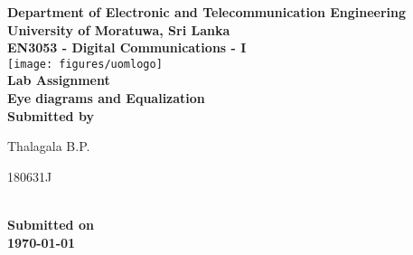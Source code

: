 \begin{titlepage}
\center %

\textbf{\large Department of Electronic and Telecommunication Engineering}\\[0.5cm]
\textbf{\Large University of Moratuwa, Sri Lanka}\\[1cm]
\textbf{\large EN3053 - Digital Communications - I}\\[2cm]
\texttt{[image: figures/uomlogo]}\\[2cm]

	
\textbf{\Huge Lab Assignment}\\[0.5cm]
\textbf{\Large Eye diagrams and Equalization }\\[5cm]



\textbf{\large Submitted by}\\[0.5cm]
\begin{minipage}{0.2\textwidth}
	\begin{flushleft}
		{\large Thalagala B.P.}\\[4mm]

		
		
	\end{flushleft}
\end{minipage}
\hspace{5mm}
\begin{minipage}{0.2\textwidth}
	\begin{flushright}
		{\large 180631J }\\[4mm]

	\end{flushright}
\end{minipage}\\[1.5cm]

\textbf{\large Submitted on}\\[0.5cm]
\textbf{\Large \today} %


\vfill %

\end{titlepage}